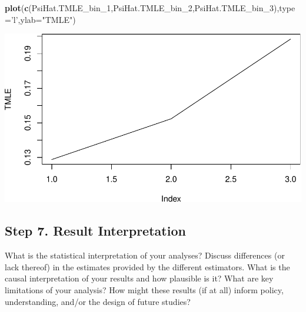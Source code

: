 \documentclass[]{article}
\newenvironment{Shaded}{\begin{snugshade}}{\end{snugshade}}
\newcommand{\KeywordTok}[1]{\textcolor[rgb]{0.13,0.29,0.53}{\textbf{#1}}}
\newcommand{\DataTypeTok}[1]{\textcolor[rgb]{0.13,0.29,0.53}{#1}}
\newcommand{\DecValTok}[1]{\textcolor[rgb]{0.00,0.00,0.81}{#1}}
\newcommand{\StringTok}[1]{\textcolor[rgb]{0.31,0.60,0.02}{#1}}
\newcommand{\NormalTok}[1]{#1}
\begin{document}
\begin{Shaded}
\begin{Highlighting}[]
\KeywordTok{plot}\NormalTok{(}\KeywordTok{c}\NormalTok{(PsiHat.TMLE_bin_}\DecValTok{1}\NormalTok{,PsiHat.TMLE_bin_}\DecValTok{2}\NormalTok{,PsiHat.TMLE_bin_}\DecValTok{3}\NormalTok{),}\DataTypeTok{type=}\StringTok{'l'}\NormalTok{,}\DataTypeTok{ylab=}\StringTok{"TMLE"}\NormalTok{)}
\end{Highlighting}
\end{Shaded}

\includegraphics{framingham_files/figure-latex/unnamed-chunk-12-1.pdf}

\subsection{Step 7. Result
Interpretation}\label{step-7.-result-interpretation}

What is the statistical interpretation of your analyses? Discuss
differences (or lack thereof) in the estimates provided by the different
estimators. What is the causal interpretation of your results and how
plausible is it? What are key limitations of your analysis? How might
these results (if at all) inform policy, understanding, and/or the
design of future studies?
\end{document}
